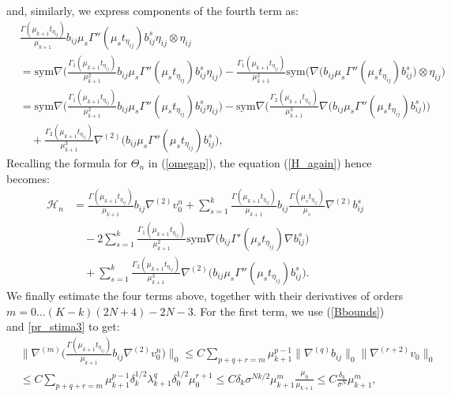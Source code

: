 \documentclass[reqno,twoside,11pt]{amsart}
\newcommand{\sym}{\mathrm{sym}}
\numberwithin{equation}{section}
\theoremstyle{plain}
\theoremstyle{definition}
\begin{document}
and, similarly, we express components of the fourth term as:
\begin{equation*}
\begin{split}
& \frac{\Gamma(\mu_{k+1}t_{\eta_{ij}})}{\mu_{k+1}} b_{ij}
\mu_s \Gamma''(\mu_s t_{\eta_{ij}})b_{ij}^s\eta_{ij}\otimes \eta_{ij}
\\ & = \sym\nabla\Big(\frac{\Gamma_1(\mu_{k+1}t_{\eta_{ij}})}{\mu_{k+1}^2} b_{ij}
\mu_s \Gamma''(\mu_s t_{\eta_{ij}})b_{ij}^s\eta_{ij}\Big) 
- \frac{\Gamma_1(\mu_{k+1}t_{\eta_{ij}})}{\mu_{k+1}^2} \sym\Big(\nabla \big(b_{ij}
\mu_s \Gamma''(\mu_s t_{\eta_{ij}})b_{ij}^s\big)\otimes \eta_{ij}\Big)
\\ & = \sym\nabla\Big(\frac{\Gamma_1(\mu_{k+1}t_{\eta_{ij}})}{\mu_{k+1}^2} b_{ij}
\mu_s \Gamma''(\mu_s t_{\eta_{ij}})b_{ij}^s\eta_{ij}\Big) 
- \sym\nabla\Big(\frac{\Gamma_2(\mu_{k+1}t_{\eta_{ij}})}{\mu_{k+1}^3} \nabla \big(b_{ij}
\mu_s \Gamma''(\mu_s t_{\eta_{ij}})b_{ij}^s\big)\Big) 
\\ & \quad + \frac{\Gamma_2(\mu_{k+1}t_{\eta_{ij}})}{\mu_{k+1}^3}
\nabla^{(2)}\Big( b_{ij}\mu_s \Gamma''(\mu_s t_{\eta_{ij}})b_{ij}^s\Big),
\end{split}
\end{equation*}
Recalling the formula for $\Theta_n$ in (\ref{omegap}), the equation
(\ref{H_again}) hence becomes:
\begin{equation}\label{H_again2}
\begin{split}
\mathcal{H}_n & = \frac{\Gamma(\mu_{k+1}t_{\eta_{ij}})}{\mu_{k+1}} b_{ij}\nabla^{(2)}v_0^n 
+ \sum_{s=1}^k \frac{\Gamma(\mu_{k+1}t_{\eta_{ij}})}{\mu_{k+1}} b_{ij}
\frac{\Gamma(\mu_s t_{\eta_{ij}})}{\mu_s}\nabla^{(2)}b_{ij}^s 
\\ & \quad - 2 \sum_{s=1}^k
\frac{\Gamma_1(\mu_{k+1}t_{\eta_{ij}})}{\mu_{k+1}^2} \sym\nabla\Big(b_{ij}
\Gamma'(\mu_s t_{\eta_{ij}})\nabla b_{ij}^s\Big)
\\ & \quad + \sum_{s=1}^k \frac{\Gamma_2(\mu_{k+1}t_{\eta_{ij}})}{\mu_{k+1}^3}
\nabla^{(2)}\Big( b_{ij}\mu_s \Gamma''(\mu_s t_{\eta_{ij}})b_{ij}^s\Big).
\end{split}
\end{equation}
We finally estimate the four terms above, together with their derivatives of
orders $m=0\ldots (K-k)(2N+4)-2N-3$. For the first term, we use
(\ref{Bbounds}) and \ref{pr_stima3} to get:
\begin{equation*}
\begin{split}
& \big\|\nabla^{(m)}\Big(\frac{\Gamma(\mu_{k+1}t_{\eta_{ij}})}{\mu_{k+1}}
b_{ij}\nabla^{(2)}v_0^n \Big)\big\|_0 \leq
C\sum_{p+q+r=m}\mu_{k+1}^{p-1}\|\nabla^{(q)}b_{ij}\|_0
\|\nabla^{(r+2)}v_0\|_0 \\ & \leq C\sum_{p+q+r=m}\mu_{k+1}^{p-1}\delta_k^{1/2}\lambda_{k+1}^q
\delta_0^{1/2}\mu_0^{r+1}\leq C \delta_{k}\sigma^{Nk/2}\mu_{k+1}^m\frac{\mu_0}{\mu_{k+1}}
\leq C\frac{\delta_k}{\sigma^N}\mu_{k+1}^m,
\end{split}
\end{equation*}
\end{document}
